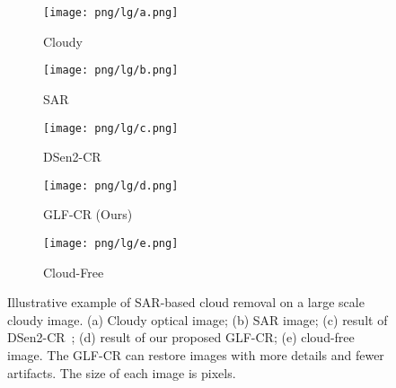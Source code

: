 \documentclass[a4paper,fleqn]{cas-dc}
\begin{document}
\def\sswidth{0.2\textwidth}
\begin{figure*}[!t]
	\centering
	\begin{subfigure}[b]{\sswidth}
		\centering
		\texttt{[image: png/lg/a.png]}
		\caption{Cloudy}
		\label{fig:highlight-Cloudy}
	\end{subfigure}\hspace{-1mm}
	\begin{subfigure}[b]{\sswidth}
		\centering
		\texttt{[image: png/lg/b.png]}
		\caption{SAR}
		\label{fig:highlight-SAR}
	\end{subfigure}\hspace{-1mm}
	\begin{subfigure}[b]{\sswidth}
		\centering
		\texttt{[image: png/lg/c.png]}
		\caption{DSen2-CR}
		\label{fig:highlight-dsen2cr}
	\end{subfigure}\hspace{-1mm}
	\begin{subfigure}[b]{\sswidth}
		\centering
		\texttt{[image: png/lg/d.png]}
		\caption{GLF-CR (Ours)}
		\label{fig:highlight-ours}
	\end{subfigure}\hspace{-1mm}
	\begin{subfigure}[b]{\sswidth}
		\centering
		\texttt{[image: png/lg/e.png]}
		\caption{Cloud-Free}
		\label{fig:highlight-Cloudfree}
	\end{subfigure}
	\caption{Illustrative example of SAR-based cloud removal on a large scale cloudy image. (a) Cloudy optical image; (b) SAR image; (c) result of DSen2-CR~\citep{meraner2020cloud}; (d) result of our proposed GLF-CR; (e) cloud-free image. The GLF-CR can restore images with more details and fewer artifacts. The size of each image is  pixels.}	
	\label{fig:highlight}
	\vspace{-3mm}
\end{figure*}
 
\end{document}
